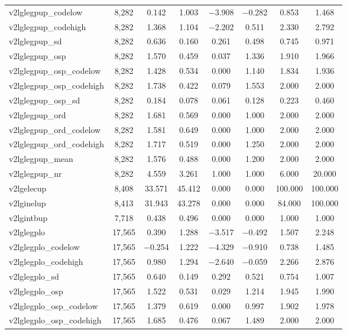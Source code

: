 \begin{table}[!htbp]
\begin{tabular}{@{\extracolsep{5pt}}lccccccc}
v2lglegpup\_codelow & 8,282 & 0.142 & 1.003 & $-$3.908 & $-$0.282 & 0.853 & 1.468 \\ 
v2lglegpup\_codehigh & 8,282 & 1.368 & 1.104 & $-$2.202 & 0.511 & 2.330 & 2.792 \\ 
v2lglegpup\_sd & 8,282 & 0.636 & 0.160 & 0.261 & 0.498 & 0.745 & 0.971 \\ 
v2lglegpup\_osp & 8,282 & 1.570 & 0.459 & 0.037 & 1.336 & 1.910 & 1.966 \\ 
v2lglegpup\_osp\_codelow & 8,282 & 1.428 & 0.534 & 0.000 & 1.140 & 1.834 & 1.936 \\ 
v2lglegpup\_osp\_codehigh & 8,282 & 1.738 & 0.422 & 0.079 & 1.553 & 2.000 & 2.000 \\ 
v2lglegpup\_osp\_sd & 8,282 & 0.184 & 0.078 & 0.061 & 0.128 & 0.223 & 0.460 \\ 
v2lglegpup\_ord & 8,282 & 1.681 & 0.569 & 0.000 & 1.000 & 2.000 & 2.000 \\ 
v2lglegpup\_ord\_codelow & 8,282 & 1.581 & 0.649 & 0.000 & 1.000 & 2.000 & 2.000 \\ 
v2lglegpup\_ord\_codehigh & 8,282 & 1.717 & 0.519 & 0.000 & 1.250 & 2.000 & 2.000 \\ 
v2lglegpup\_mean & 8,282 & 1.576 & 0.488 & 0.000 & 1.200 & 2.000 & 2.000 \\ 
v2lglegpup\_nr & 8,282 & 4.559 & 3.261 & 1.000 & 1.000 & 6.000 & 20.000 \\ 
v2lgelecup & 8,408 & 33.571 & 45.412 & 0.000 & 0.000 & 100.000 & 100.000 \\ 
v2lginelup & 8,413 & 31.943 & 43.278 & 0.000 & 0.000 & 84.000 & 100.000 \\ 
v2lgintbup & 7,718 & 0.438 & 0.496 & 0.000 & 0.000 & 1.000 & 1.000 \\ 
v2lglegplo & 17,565 & 0.390 & 1.288 & $-$3.517 & $-$0.492 & 1.507 & 2.248 \\ 
v2lglegplo\_codelow & 17,565 & $-$0.254 & 1.222 & $-$4.329 & $-$0.910 & 0.738 & 1.485 \\ 
v2lglegplo\_codehigh & 17,565 & 0.980 & 1.294 & $-$2.640 & $-$0.059 & 2.266 & 2.876 \\ 
v2lglegplo\_sd & 17,565 & 0.640 & 0.149 & 0.292 & 0.521 & 0.754 & 1.007 \\ 
v2lglegplo\_osp & 17,565 & 1.522 & 0.531 & 0.029 & 1.214 & 1.945 & 1.990 \\ 
v2lglegplo\_osp\_codelow & 17,565 & 1.379 & 0.619 & 0.000 & 0.997 & 1.902 & 1.978 \\ 
v2lglegplo\_osp\_codehigh & 17,565 & 1.685 & 0.476 & 0.067 & 1.489 & 2.000 & 2.000 \\ 

\end{tabular}
\end{table}
